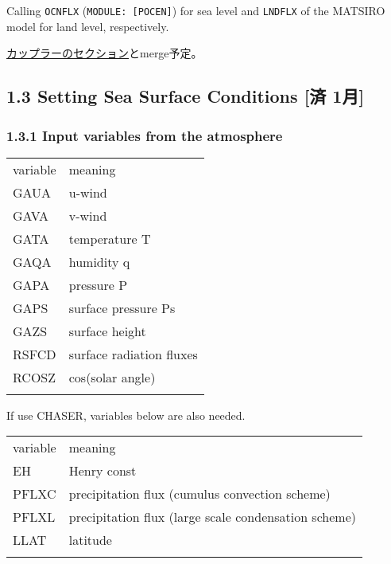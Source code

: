Calling \texttt{OCNFLX} (\texttt{MODULE:\ {[}POCEN{]}}) for sea level
and \texttt{LNDFLX} of the MATSIRO model for land level, respectively.

\href{https://github.com/MIROC-DOC/model_description/blob/coupler_iwakiri/draft/AO-coupler.md}{カップラーのセクション}とmerge予定。

\hypertarget{setting-sea-surface-conditions-ux6e08-1ux6708}{%
\subsection{1.3 Setting Sea Surface Conditions {[}済
1月{]}}\label{setting-sea-surface-conditions-ux6e08-1ux6708}}

\hypertarget{input-variables-from-the-atmosphere}{%
\subsubsection{1.3.1 Input variables from the
atmosphere}\label{input-variables-from-the-atmosphere}}

\setlength\LTleft{0pt}\setlength\LTright{0pt}\begin{longtable}[]{@{}ll@{}}
\toprule\relax
variable & meaning \\ \addlinespace
\midrule\relax
\endhead
GAUA & u-wind \\ \addlinespace
GAVA & v-wind \\ \addlinespace
GATA & temperature T \\ \addlinespace
GAQA & humidity q \\ \addlinespace
GAPA & pressure P \\ \addlinespace
GAPS & surface pressure Ps \\ \addlinespace
GAZS & surface height \\ \addlinespace
RSFCD & surface radiation fluxes \\ \addlinespace
RCOSZ & cos(solar angle) \\ \addlinespace
\bottomrule
\end{longtable}

If use CHASER, variables below are also needed.

\setlength\LTleft{0pt}\setlength\LTright{0pt}\begin{longtable}[]{@{}ll@{}}
\toprule\relax
variable & meaning \\ \addlinespace
\midrule\relax
\endhead
EH & Henry const \\ \addlinespace
PFLXC & precipitation flux (cumulus convection scheme) \\ \addlinespace
PFLXL & precipitation flux (large scale condensation
scheme) \\ \addlinespace
LLAT & latitude \\ \addlinespace
\bottomrule
\end{longtable}

